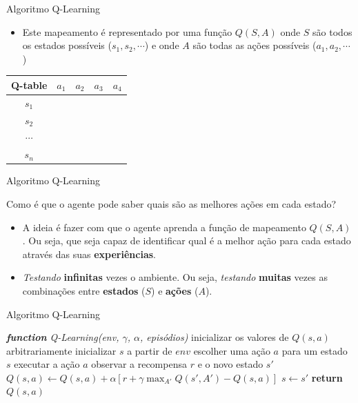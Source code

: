 \documentclass{beamer}
\def\HiLi{\leavevmode\rlap{\hbox to \hsize{\color{yellow!50}\leaders\hrule height .8\baselineskip depth .5ex\hfill}}}
\begin{document}
\begin{frame}{Algoritmo Q-Learning}
	
\begin{itemize}
	
	\item Este mapeamento é representado por uma função $Q(S,A)$ onde $S$ são 
	todos os estados possíveis ($s_{1}, s_{2}, \cdots$) e onde $A$ são todas as 
	ações possíveis ($a_{1}, a_{2}, \cdots$)

\end{itemize}

	\begin{center}
	\begin{tabular}{ |c|c|c|c|c| } 
		\hline
		 \textbf{Q-table}  & $a_{1}$ & $a_{2}$ & $a_{3}$& $a_{4}$ \\
		 \hline
		$s_{1}$&  &  &  & \\ 
		\hline
		$s_{2}$&  &  &  & \\ 
\hline
		$\cdots$&  &  &  & \\ 
\hline
		$s_{n}$&  &  &  & \\ 
\hline
	\end{tabular}
\end{center}

\end{frame}

\begin{frame}{Algoritmo Q-Learning}

	\begin{block}{}
		Como é que o agente pode saber quais são as melhores ações em cada estado?
	\end{block}

\pause

	\begin{itemize}
		\item A ideia é fazer com que o agente aprenda a função de mapeamento $Q(S,A)$. 
		Ou seja, que seja capaz de identificar qual é a melhor ação para cada estado 
		através das suas \textbf{experiências}. 
		\item \textit{Testando} \textbf{infinitas} vezes o ambiente. 
		Ou seja, \textit{testando} \textbf{muitas} vezes as combinações entre 
		\textbf{estados} ($S$) e \textbf{ações} ($A$). 
	\end{itemize}

\end{frame}


\begin{frame}{Algoritmo Q-Learning} 
	\begin{algorithmic} 
		\STATE \emph{\textbf{function} Q-Learning(env, $\gamma$, $\alpha$, episódios)}
		\STATE inicializar os valores de $Q(s, a)$ arbitrariamente
		\STATE inicializar $s$ a partir de $env$
		\REPEAT
		\STATE escolher uma ação $a$ para um estado $s$
		\STATE executar a ação $a$
		\STATE observar a recompensa $r$ e o novo estado $s'$ 
		\STATE \HiLi $Q(s,a) \leftarrow Q(s,a) + \alpha[r + \gamma \max_{A'}Q(s',A') - Q(s,a)]$ 
		\STATE$s  \leftarrow s'$
		\ENDFOR
		\STATE \textbf{return} $Q(s, a)$
	\end{algorithmic}
\end{frame}
\end{document}
